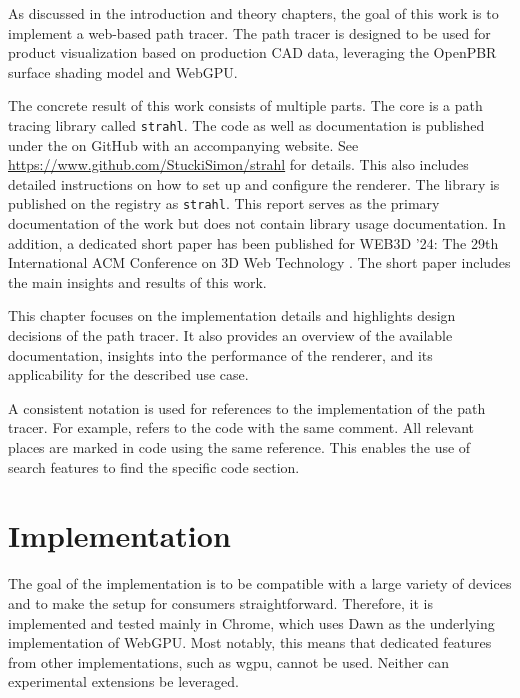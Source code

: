 
As discussed in the introduction and theory chapters, the goal of this work is to implement a web-based path tracer. The path tracer is designed to be used for product visualization based on production \gls{CAD} data, leveraging the \gls{OpenPBR} surface shading model and \gls{WebGPU}.

The concrete result of this work consists of multiple parts. The core is a path tracing library called \texttt{strahl}. The code as well as documentation is published under the  on GitHub with an accompanying website. See \url{https://www.github.com/StuckiSimon/strahl} for details. This also includes detailed instructions on how to set up and configure the renderer. The library is published on the  registry as \texttt{strahl}. This report serves as the primary documentation of the work but does not contain library usage documentation. In addition, a dedicated short paper has been published for WEB3D '24: The 29th International ACM Conference on 3D Web Technology \cite{ownShortPaper}. The short paper includes the main insights and results of this work.

This chapter focuses on the implementation details and highlights design decisions of the path tracer. It also provides an overview of the available documentation, insights into the performance of the renderer, and its applicability for the described use case.

A consistent notation is used for references to the implementation of the path tracer. For example,  refers to the code with the same comment. All relevant places are marked in code using the same reference. This enables the use of search features to find the specific code section.

\section{Implementation}

The goal of the implementation is to be compatible with a large variety of devices and to make the setup for consumers straightforward. Therefore, it is implemented and tested mainly in Chrome, which uses \gls{Dawn} as the underlying implementation of \gls{WebGPU}. Most notably, this means that dedicated features from other implementations, such as \gls{wgpu}, cannot be used. Neither can experimental extensions be leveraged.

